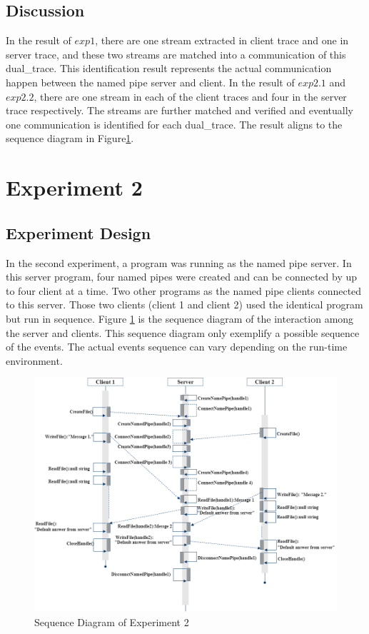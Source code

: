 \subsection{Discussion}
In the result of $exp1$, there are one stream extracted in client trace and one in server trace, and these two streams are matched into a communication of this dual\_trace. This identification result represents the actual communication happen between the named pipe server and client.
In the result of $exp2.1$ and $exp2.2$, there are one stream in each of the client traces and four in the server trace respectively. The streams are further matched and verified and eventually one communication is identified for each dual\_trace. The result aligns to the sequence diagram in Figure\ref{exp2}.

\section{Experiment 2}
\subsection{Experiment Design}
In the second experiment, a program was running as the named pipe server. In this server program, four named pipes were created and can be connected by up to four client at a time. Two other programs as the named pipe clients connected to this server. Those two clients (client 1 and client 2) used the identical program but run in sequence. Figure \ref{exp2} is the sequence diagram of the interaction among the server and clients. This sequence diagram only exemplify a possible sequence of the events. The actual events sequence can vary depending on the run-time environment. 

\begin{figure}[H]
\centerline{\includegraphics[scale=0.6]{Figures/exp2}}
 \caption{Sequence Diagram of Experiment 2}
\label{exp2}
\end{figure}

